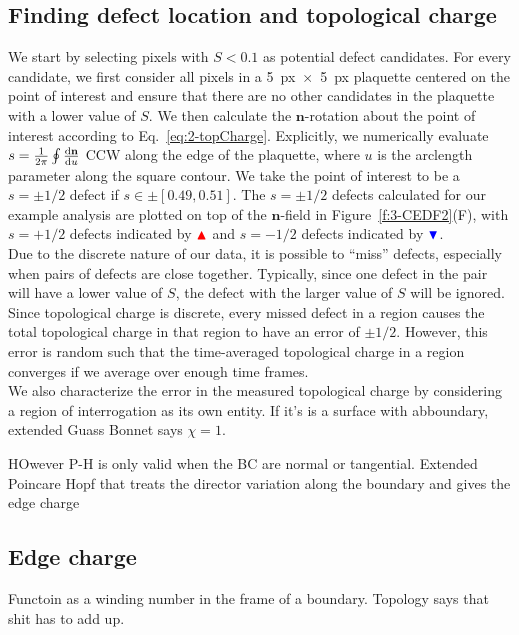 \subsection{Finding defect location and topological charge}
We start by selecting pixels with $S < 0.1$ as potential defect candidates.
For every candidate, we first consider all pixels in a 5~px~$\times$~5~px plaquette centered on the point of interest and ensure that there are no other candidates in the plaquette with a lower value of $S$.
We then calculate the $\mathbf{n}$-rotation about the point of interest according to Eq.~\ref{eq:2-topCharge}.
Explicitly, we numerically evaluate $s = \frac{1}{2\pi} \oint \frac{\textup{d}\mathbf{n}}{\textup{d}u}$ CCW along the edge of the plaquette, where $u$ is the arclength parameter along the square contour.
We take the point of interest to be a $s = \pm 1/2$ defect if $s \in \pm [0.49,0.51]$.
The $s=\pm1/2$ defects calculated for our example analysis are plotted on top of the $\mathbf{n}$-field in Figure~\ref{f:3-CEDF2}(F), with $s = +1/2$ defects indicated by ${\color{red} \blacktriangle } $  and $s = -1/2$ defects indicated by ${ \color{blue} \blacktriangledown } $.\\

Due to the discrete nature of our data, it is possible to ``miss'' defects, especially when pairs of defects are close together.
Typically, since one defect in the pair will have a lower value of $S$, the defect with the larger value of $S$ will be ignored.
Since topological charge is discrete, every missed defect in a region causes the total topological charge in that region to have an error of $\pm 1/2$.
However, this error is random such that the time-averaged topological charge in a region converges if we average over enough time frames. \\

We also characterize the error in the measured topological charge by considering a region of interrogation as its own entity.
If it's is a surface with abboundary, extended Guass Bonnet says $\chi = 1$.

HOwever P-H is only valid when the BC are normal or tangential.
Extended Poincare Hopf that treats the director variation along the boundary and gives the edge charge


\subsection{Edge charge}
Functoin as a winding number in the frame of a boundary.  Topology says that shit has to add up.

